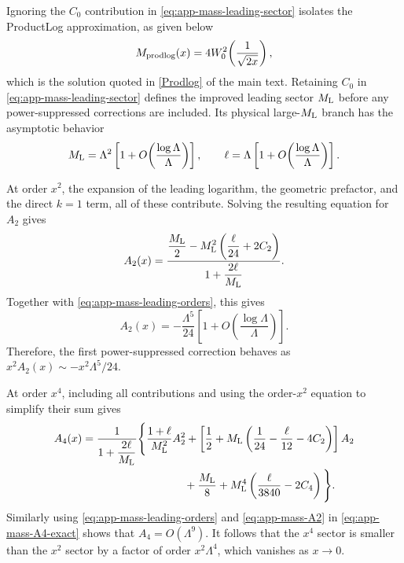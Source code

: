 \documentclass[a4paper,11pt]{article}
\begin{document}
Ignoring the $C_0$ contribution in
\eqref{eq:app-mass-leading-sector} isolates the ProductLog
approximation, as given below
\begin{equation*}
	M_{\rm prodlog}(x)
=	
	4W_0^2\!\left(\frac1{\sqrt{2x}}\right),
\end{equation*}
which is the solution quoted in \eqref{Prodlog} of the main text.
Retaining $C_0$ in \eqref{eq:app-mass-leading-sector} defines the
improved leading sector $M_{\rm L}$ before any power-suppressed
corrections are included.  Its physical large-$M_{\rm L}$ branch has
the asymptotic behavior
\begin{equation}
	M_{\rm L}
	=
	\Lambda^2
	\left[
	1+O\!\left(
	\frac{\log\Lambda}{\Lambda}
	\right)
	\right],
	\qquad
	\ell
	=
	\Lambda
	\left[
	1+O\!\left(
	\frac{\log\Lambda}{\Lambda}
	\right)
	\right].
	\label{eq:app-mass-leading-orders}
\end{equation}

At order $x^2$, the expansion of the leading logarithm, the geometric
prefactor, and the direct $k=1$ term, all of these contribute.  Solving the
resulting equation for $A_2$ gives
\begin{equation}
	A_2(x)
	=
	\frac{\displaystyle
		\frac{M_{\rm L}}2
		-M_{\rm L}^2
		\left(
		\frac{\ell}{24}+2C_2
		\right)}
	{\displaystyle
		1+\frac{2\ell}{M_{\rm L}}}.
	\label{eq:app-mass-A2-exact}
\end{equation}
Together with \eqref{eq:app-mass-leading-orders}, this gives
\begin{equation}
	A_2(x)
	=
	-\frac{\Lambda^5}{24}
	\left[
	1+O\!\left(
	\frac{\log\Lambda}{\Lambda}
	\right)
	\right].
	\label{eq:app-mass-A2}
\end{equation}
Therefore, the first power-suppressed correction behaves as
$x^2A_2(x)\sim-x^2\Lambda^5/24$.

At order $x^4$, including all contributions and using the order-$x^2$
equation to simplify their sum gives
\begin{align}
	A_4(x)
	={}&
	\frac{1}{\displaystyle
		1+\frac{2\ell}{M_{\rm L}}}
	\Bigg\{
	\frac{1+\ell}{M_{\rm L}^2}A_2^2
	+\left[
	\frac12
	+M_{\rm L}
	\left(
	\frac1{24}
	-\frac{\ell}{12}
	-4C_2
	\right)
	\right]A_2
	\nonumber\\
	&\hspace{28mm}
	+\frac{M_{\rm L}}8
	+M_{\rm L}^4
	\left(
	\frac{\ell}{3840}
	-2C_4
	\right)
	\Bigg\}.
	\label{eq:app-mass-A4-exact}
\end{align}
Similarly using \eqref{eq:app-mass-leading-orders} and
\eqref{eq:app-mass-A2} in \eqref{eq:app-mass-A4-exact} shows that
$A_4=O(\Lambda^9)$.  It follows that the $x^4$ sector is smaller than
the $x^2$ sector by a factor of order $x^2\Lambda^4$, which vanishes as
$x\to0$.\\
%
\end{document}
